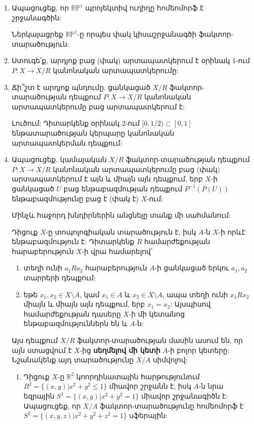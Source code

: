 \begin{enumerate}[label=\thesection.\arabic*.]
\item Ապացուցեք, որ $\mathbb{RP}^1$ պրոյեկտիվ ուղիղը հոմեոմորֆ է շրջանագծին:

\begin{hint}
Ներկայացրեք $\mathbb{RP}^1$-ը որպես փակ կիսաշրջանագծի ֆակտոր-տարածություն:
\end{hint}

\item Ստուգե՛ք, արդյոք բաց (փակ) արտապատկերում է օրինակ 1-ում $P: X \to X/R$ կանոնական արտապատկերումը:

\item Ճի՞շտ է արդյոք պնդումը. ցանկացած $X/R$ ֆակտոր-տարածության դեպքում $P: X \to X/R$ կանոնական արտապատկերումը բաց արտապատկերում է:
\par Լուծում: Դիտարկենք օրինակ 2-ում $[0, 1/2) \subset [0, 1]$ ենթատարածության կերպարը կանոնական արտապատկերման դեպքում:

\item Ապացուցեք. կամայական $X/R$ ֆակտոր-տարածության դեպքում $P: X \to X/R$ կանոնական արտապատկերումը բաց (փակ) արտապատկերում է այն և միայն այն դեպքում, երբ $X$-ի ցանկացած $U$ բաց ենթաբազմության դեպքում $P^{-1}(P(U))$ ենթաբազմությունը բաց է (փակ է) $X$-ում:

\par Մինչև հաջորդ խնդիրներին անցնելը տանք մի սահմանում:
\par Դիցուք $X$-ը տոպոլոգիական տարածություն է, իսկ $A$-ն $X$-ի որևէ ենթաբազմություն է: Դիտարկենք $R$ համարժեքության հարաբերություն $X$-ի վրա համարելով՝
\begin{enumerate}
    \item[ա)] տեղի ունի $a_1 R a_2$ հարաբերություն $A$-ի ցանկացած երկու $a_1, a_2$ տարրերի դեպքում;
    \item[բ)] եթե $x_1, x_2 \in X \setminus A$, կամ $x_1 \in A$ և $x_2 \in X \setminus A$, ապա տեղի ունի $x_1 R x_2$ միայն և միայն այն դեպքում, երբ $x_1 = x_2$: Այսպիսով համարժեքության դասերը $X$-ի մի կետանոց ենթաբազմություններն են և $A$-ն:
\end{enumerate}
\par Այս դեպքում $X/R$ ֆակտոր-տարածության մասին ասում են, որ այն ստացվում է $X$-ից \textbf{սեղմելով մի կետի} $A$-ի բոլոր կետերը: Նշանակենք այդ տարածությունը $X/A$ սիմվոլով:

\begin{enumerate}[label=\thesection.\arabic*., resume]

\item Դիցուք $X$-ը $\mathbb{R}^2$ կոորդինատային հարթությունում $B^2 = \{(x, y) | x^2+y^2 \le 1\}$ միավոր շրջանն է, իսկ $A$-ն նրա եզրային $S^1 = \{(x, y) | x^2+y^2 = 1\}$ միավոր շրջանագիծն է: Ապացուցեք, որ $X/A$ ֆակտոր-տարածությունը հոմեոմորֆ է $S^2 = \{(x, y, z) | x^2+y^2+z^2=1\}$ սֆերային:
\par {}


\end{enumerate}
\end{enumerate}
